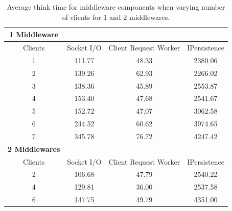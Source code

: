 \documentclass{article}
\begin{document}
            \begin{table}
                \begin{tabular}{|c|c|c|c|}
                \hline
                \textbf{1 Middleware} & & &\\
                \hline
                Clients & Socket I/O & Client Request Worker & IPersistence \\ \hline
                1&  111.77 &    48.33 &  2380.06\\ \hline  
                 2& 139.26 &    62.93 &  2266.02\\ \hline  
                 3& 138.36 &    45.89 &  2553.87\\ \hline  
                 4& 153.40 &    47.68 &  2541.67\\ \hline  
                 5& 152.72 &    47.07 &  3062.58\\ \hline  
                 6& 244.52 &    60.62 &  3974.65\\ \hline  
                 7& 345.78 &    76.72 &  4247.42\\ \hline    
                \textbf{2 Middlewares} & & & \\  \hline
                Clients &   Socket I/O & Client Request Worker & IPersistence \\ \hline
                 2& 106.68 &    47.79 &  2540.22\\ \hline  
                 4& 129.81 &    36.00 &  2537.58\\ \hline  
                 6& 147.75 &    49.79 &  4351.00\\ \hline  
                \end{tabular}
                \caption{Average think time for middleware components when varying number of clients for 1 and 2 middlewares.}
                \label{table:thinktime_middleware_clients}
            \end{table}                
            
\end{document}

